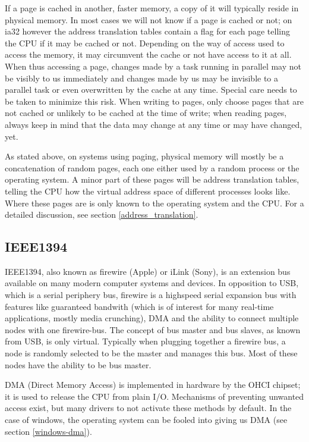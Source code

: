 If a page is cached in another, faster memory, a copy of it will typically
reside in physical memory. In most cases we will not know if a page is cached
or not; on ia32 however the address translation tables contain a flag for each
page telling the CPU if it may be cached or not. Depending on the way of access
used to access the memory, it may circumvent the cache or not have access to it
at all. When thus accessing a page, changes made by a task running in parallel
may not be visibly to us immediately and changes made by us may be invisible to
a parallel task or even overwritten by the cache at any time. Special care
needs to be taken to minimize this risk. When writing to pages, only choose
pages that are not cached or unlikely to be cached at the time of write; when
reading pages, always keep in mind that the data may change at any time or may
have changed, yet.

As stated above, on systems using paging, physical memory will mostly be a
concatenation of random pages, each one either used by a random process or the
operating system. A minor part of these pages will be address translation
tables, telling the CPU how the virtual address space of different processes
looks like. Where these pages are is only known to the operating system and the
CPU. For a detailed discussion, see section \ref{address_translation}.



\subsection{IEEE1394}

IEEE1394, also known as firewire (Apple) or iLink (Sony), is an extension bus
available on many modern computer systems and devices.  In opposition to USB,
which is a serial periphery bus, firewire is a highspeed serial expansion bus
with features like guaranteed bandwith (which is of interest for many real-time
applications, mostly media crunching), DMA and the ability to connect multiple
nodes with one firewire-bus. The concept of bus master and bus slaves, as known
from USB, is only virtual. Typically when plugging together a firewire bus, a
node is randomly selected to be the master and manages this bus. Most of these
nodes have the ability to be bus master.

DMA (Direct Memory Access) is implemented in hardware by the OHCI chipset; it
is used to release the CPU from plain I/O. Mechanisms of preventing unwanted
access exist, but many drivers to not activate these methods by default. In the
case of windows, the operating system can be fooled into giving us DMA (see
section \ref{windows-dma}).

